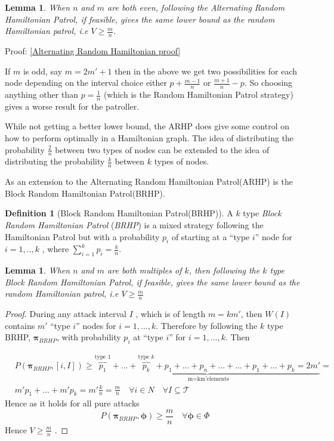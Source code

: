 \documentclass[a4paper,10pt]{article}
\newtheorem{lemma}[theorem]{Lemma}
\theoremstyle{definition}
\newtheorem{definition}[theorem]{Definition}
\theoremstyle{definition}
\theoremstyle{remark}
\theoremstyle{definition}
\begin{document}
\begin{lemma}
When $n$ and $m$ are both even, following the Alternating Random Hamiltonian Patrol, if feasible, gives the same lower bound as the random Hamiltonian patrol, i.e $V \geq \frac{m}{n}$.
\end{lemma}

Proof: \ref{Alternating Random Hamiltonian proof}

If $m$ is odd, say $m=2m'+1$ then in the above we get two possibilities for each node depending on the interval choice either $p+\frac{m-1}{n}$ or $\frac{m+1}{n}-p$. So choosing anything other than $p=\frac{1}{n}$ (which is the Random Hamiltonian Patrol strategy) gives a worse result for the patroller.

While not getting a better lower bound, the ARHP does give some control on how to perform optimally in a Hamiltonian graph. The idea of distributing the probability $\frac{2}{n}$ between two types of nodes can be extended to the idea of distributing the probability $\frac{k}{n}$ between $k$ types of nodes.

As an extension to the Alternating Random Hamiltonian Patrol(ARHP) is the Block Random Hamiltonian Patrol(BRHP).

\begin{definition}[Block Random Hamiltonian Patrol(BRHP)]
A $k$ type \textit{Block Random Hamiltonian Patrol} (\textit{BRHP}) is a mixed strategy following the Hamiltonian Patrol but with a probability $p_{i}$ of starting at a ``type $i$'' node for $i=1,..,k$ , where $\sum\limits_{i=1}^{k} p_{i}=\frac{k}{n}$.
\end{definition}

\begin{lemma}
When $n$ and $m$ are both multiples of $k$, then following the $k$ type Block Random Hamiltonian Patrol, if feasible, gives the same lower bound as the random Hamiltonian patrol, i.e $V \geq \frac{m}{n}$
\end{lemma}

\begin{proof}
During any attack interval $I$ , which is of length $m=km'$, then $W(I)$ contains $m'$ ``type $i$'' nodes for $i=1,...,k$. Therefore by following the $k$ type BRHP, $\bm{\pi}_{BRHP}$, with probability $p_{i}$ at ``type $i$'' for $i=1,...,k$. Then

\begin{align*}
&P(\bm{\pi}_{BRHP},[i,I]) \geq \underbrace{\overbrace{p_{1}}^{\text{type } 1}+...+
\overbrace{p_{k}}^{\text{type } k}+p_{1}+...+p_{n}+...+...+p_{1}+...+p_{k}=2m'}_{\text{ m=km'elements}}= \\
&m' p_{1}+...+m'p_{k}=m' \frac{k}{n}=\frac{m}{n} \quad \forall i \in N \quad \forall I \subseteq \mathcal{T}
\end{align*}
Hence as it holds for all pure attacks
$$P(\bm{\pi}_{BRHP},\pmb{\phi}) \geq \frac{m}{n} \quad \forall \bm{\phi} \in \Phi$$
Hence $V \geq \frac{m}{n}$ .
\end{proof}
\end{document}
